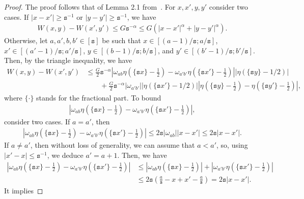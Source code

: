 \documentclass[11pt]{article}
\newcommand{\<}{\langle}
\renewcommand{\>}{\rangle}
\newcommand{\ts}{\mathtt{s}}
\theoremstyle{plain}
\theoremstyle{definition}
\theoremstyle{remark}
\begin{document}
{\begin{proof} The proof follows that of Lemma 2.1 from~\citep{gao2014rate}. For $x, x', y, y'$ consider two cases. If $|x - x'| \ge \ts^{-1}$ or $|y - y'| \ge \ts^{-1}$, we have
\begin{align*}
    W(x, y) - W(x', y') \le G \ts^{-\alpha} \le  G (|x - x'|^{\alpha} + |y - y'|^{\alpha}).
\end{align*}
Otherwise, let $a, a', b, b' \in [\ts]$ be such that $x \in [(a - 1)/\ts; a/\ts]$, $x' \in [(a' - 1)/\ts; a'/\ts]$, $y \in [(b - 1)/\ts; b/\ts]$, and $y' \in [(b' - 1)/\ts; b'/\ts]$. Then, by the triangle inequality, we have
\begin{align}
    W (x, y) - W(x', y') & \le \frac{G}{2} \ts^{-\alpha} |\omega_{ab} \eta\left (\{\ts x\} - \frac{1}{2} \right ) - \omega_{a' b'}\eta \left (\{\ts x'\} - \frac{1}{2} \right )| |\eta(\{\ts y\} - 1/2)| \nonumber \\
    & \qquad +  \frac{G}{2} \ts^{-\alpha} |\omega_{a'b'}| |\eta \left ( \{\ts x' \} - 1/2\right )| |\eta \left (\{\ts y\} - \frac{1}{2}\right ) - \eta \left  (\{\ts y'\} - \frac{1}{2} \right )|, \label{eq: triangle inequality in Holder graphon construction}
\end{align}
where $\{\cdot\}$ stands for the fractional part. To bound
\begin{align*}
    \left |\omega_{ab} \eta\left (\{\ts x\} - \frac{1}{2} \right ) - \omega_{a' b'}\eta \left (\{\ts x'\} - \frac{1}{2} \right ) \right |,
\end{align*}
consider two cases. If $a = a'$, then 
\begin{align*}
    \left |\omega_{ab} \eta\left (\{\ts x\} - \frac{1}{2} \right ) - \omega_{a' b'}\eta \left (\{\ts x'\} - \frac{1}{2} \right ) \right | \le 2 \ts |\omega_{ab}| |x - x'| \le 2 \ts |x - x'|.
\end{align*}
If $a \neq a'$, then without loss of generality, we can assume that $a < a'$, so, using $|x' - x| \le \ts^{-1}$, we deduce $a' = a + 1$. Then, we have
\begin{align*}
    \left |\omega_{ab} \eta\left (\{\ts x\} - \frac{1}{2} \right ) - \omega_{a' b'}\eta \left (\{\ts x'\} - \frac{1}{2} \right ) \right | & \le \left |\omega_{ab} \eta\left (\{\ts x\} - \frac{1}{2} \right ) \right | + \left |\omega_{a' b'}\eta \left (\{\ts x'\} - \frac{1}{2} \right ) \right |  \\
    & \le 2 \ts \left ( \frac{a}{\ts} - x + x' - \frac{a}{\ts} \right ) = 2 \ts |x - x'|.
\end{align*}
It implies

\end{proof}}
\end{document}
